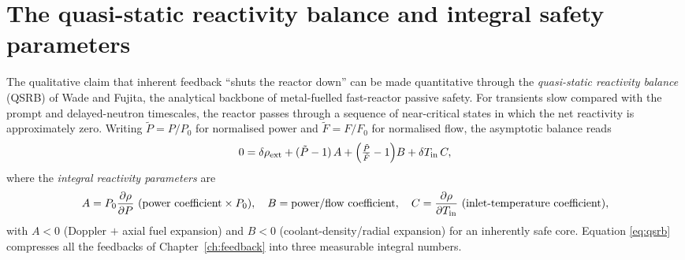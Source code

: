 


\section{The quasi-static reactivity balance and integral safety parameters}
\label{sec:qsrb}

The qualitative claim that inherent feedback ``shuts the reactor down'' can be made
quantitative through the \emph{quasi-static reactivity balance} (QSRB) of Wade and
Fujita, the analytical backbone of metal-fuelled fast-reactor passive safety. For
transients slow compared with the prompt and delayed-neutron timescales, the
reactor passes through a sequence of near-critical states in which the net
reactivity is approximately zero. Writing $\tilde P=P/P_0$ for normalised power and
$\tilde F=F/F_0$ for normalised flow, the asymptotic balance reads
\begin{equation}
0=\delta\rho_{\rm ext}+(\tilde P-1)\,A+\Big(\tfrac{\tilde P}{\tilde F}-1\Big)B
   +\delta T_{\rm in}\,C,
\label{eq:qsrb}
\end{equation}
where the \emph{integral reactivity parameters} are
\begin{equation}
A=P_0\frac{\partial\rho}{\partial P}\ (\text{power coefficient}\times P_0),\quad
B=\text{power/flow coefficient},\quad
C=\frac{\partial\rho}{\partial T_{\rm in}}\ (\text{inlet-temperature coefficient}),
\end{equation}
with $A<0$ (Doppler $+$ axial fuel expansion) and $B<0$ (coolant-density/radial
expansion) for an inherently safe core. Equation \eqref{eq:qsrb} compresses all the
feedbacks of Chapter~\ref{ch:feedback} into three measurable integral numbers.

